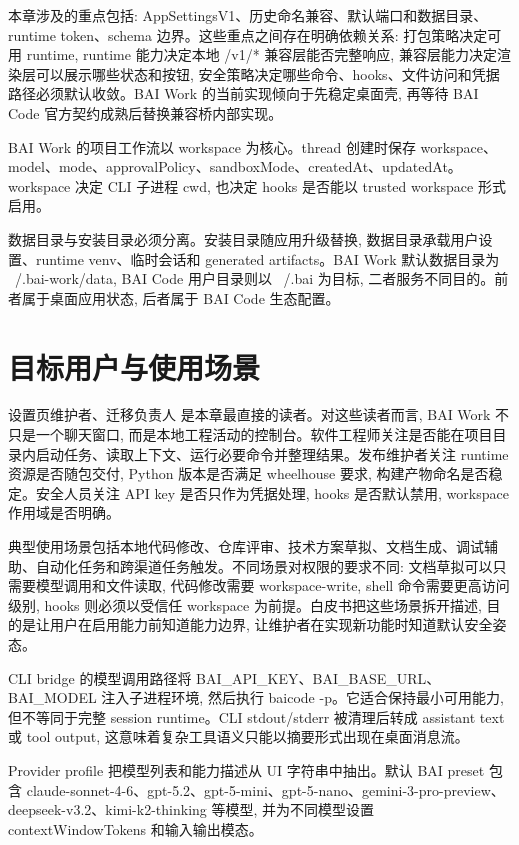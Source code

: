 本章涉及的重点包括: AppSettingsV1、历史命名兼容、默认端口和数据目录、runtime token、schema 边界。这些重点之间存在明确依赖关系: 打包策略决定可用 runtime, runtime 能力决定本地 /v1/* 兼容层能否完整响应, 兼容层能力决定渲染层可以展示哪些状态和按钮, 安全策略决定哪些命令、hooks、文件访问和凭据路径必须默认收敛。BAI Work 的当前实现倾向于先稳定桌面壳, 再等待 BAI Code 官方契约成熟后替换兼容桥内部实现。

BAI Work 的项目工作流以 workspace 为核心。thread 创建时保存 workspace、model、mode、approvalPolicy、sandboxMode、createdAt、updatedAt。workspace 决定 CLI 子进程 cwd, 也决定 hooks 是否能以 trusted workspace 形式启用。

数据目录与安装目录必须分离。安装目录随应用升级替换, 数据目录承载用户设置、runtime venv、临时会话和 generated artifacts。BAI Work 默认数据目录为 ~/.bai-work/data, BAI Code 用户目录则以 ~/.bai 为目标, 二者服务不同目的。前者属于桌面应用状态, 后者属于 BAI Code 生态配置。

\section{目标用户与使用场景}
设置页维护者、迁移负责人 是本章最直接的读者。对这些读者而言, BAI Work 不只是一个聊天窗口, 而是本地工程活动的控制台。软件工程师关注是否能在项目目录内启动任务、读取上下文、运行必要命令并整理结果。发布维护者关注 runtime 资源是否随包交付, Python 版本是否满足 wheelhouse 要求, 构建产物命名是否稳定。安全人员关注 API key 是否只作为凭据处理, hooks 是否默认禁用, workspace 作用域是否明确。

典型使用场景包括本地代码修改、仓库评审、技术方案草拟、文档生成、调试辅助、自动化任务和跨渠道任务触发。不同场景对权限的要求不同: 文档草拟可以只需要模型调用和文件读取, 代码修改需要 workspace-write, shell 命令需要更高访问级别, hooks 则必须以受信任 workspace 为前提。白皮书把这些场景拆开描述, 目的是让用户在启用能力前知道能力边界, 让维护者在实现新功能时知道默认安全姿态。

CLI bridge 的模型调用路径将 BAI\_API\_KEY、BAI\_BASE\_URL、BAI\_MODEL 注入子进程环境, 然后执行 baicode -p。它适合保持最小可用能力, 但不等同于完整 session runtime。CLI stdout/stderr 被清理后转成 assistant text 或 tool output, 这意味着复杂工具语义只能以摘要形式出现在桌面消息流。

Provider profile 把模型列表和能力描述从 UI 字符串中抽出。默认 BAI preset 包含 claude-sonnet-4-6、gpt-5.2、gpt-5-mini、gpt-5-nano、gemini-3-pro-preview、deepseek-v3.2、kimi-k2-thinking 等模型, 并为不同模型设置 contextWindowTokens 和输入输出模态。

